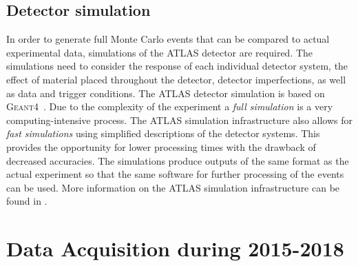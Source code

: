 \subsection{Detector simulation}
In order to generate full Monte Carlo events that can be compared to actual experimental data, simulations of the ATLAS detector are required.
The simulations need to consider the response of each individual detector system, the effect of material placed throughout the detector, detector imperfections, as well as data and trigger conditions.
The ATLAS detector simulation is based on \textsc{Geant4}~\cite{Agostinelli:2002hh}.
Due to the complexity of the experiment a \emph{full simulation} is a very computing-intensive process. The ATLAS simulation infrastructure also allows for \emph{fast simulations} using simplified descriptions of the detector systems. This provides the opportunity for lower processing times with the drawback of decreased accuracies.
The simulations produce outputs of the same format as the actual experiment so that the same software for further processing of the events can be used.
More information on the ATLAS simulation infrastructure can be found in .



\section{Data Acquisition during 2015-2018}
\label{sec:run-2-data-taking}


